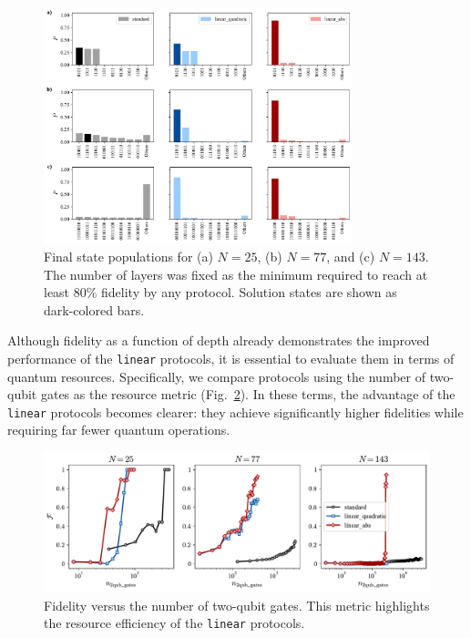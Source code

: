 \begin{figure}[h]
    \centering
    \includegraphics[width=0.8\textwidth]{04-results/figs/populations_2577143.pdf}
    \caption{Final state populations for (a) $N=25$, (b) $N=77$, and (c) $N=143$. The number
    of layers was fixed as the minimum required to reach at least 80\% fidelity by any
    protocol. Solution states are shown as dark-colored bars.}
    \label{fig:populations}
\end{figure}

Although fidelity as a function of depth already demonstrates the improved performance of the \texttt{linear} protocols, it is essential to evaluate them in terms of quantum resources. Specifically, we compare protocols using the number of two-qubit gates as the resource metric (Fig.~\ref{fig:fidelity_gates}). In these terms, the advantage of the \texttt{linear} protocols becomes clearer: they achieve significantly higher fidelities while requiring far fewer quantum operations.  

\begin{figure}[h]
    \centering
    \includegraphics[width=1\textwidth]{04-results/figs/fidelity_gates_2577143.pdf}
    \caption{Fidelity versus the number of two-qubit gates. This metric highlights the resource efficiency of the \texttt{linear} protocols.}
    \label{fig:fidelity_gates}
\end{figure}

